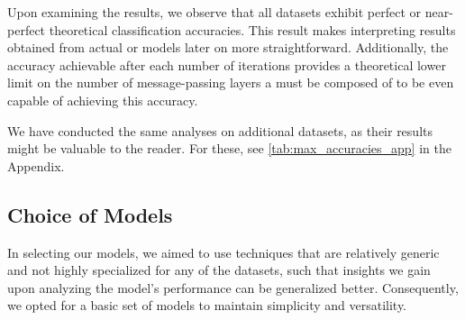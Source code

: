 \begin{table}[!htb]
	\caption{An overview of the maximum theoretical classification accuracy achievable for each dataset based on the number of \wl iterations in percent. A hyphen ``-'' indicates that the maximum accuracy has converged with fewer iterations, implying that further iterations do not improve the accuracy.}
	\label{tab:max_accuracies}
\end{table}

Upon examining the results, we observe that all datasets exhibit perfect or near-perfect theoretical classification accuracies. This result makes interpreting results obtained from actual \wlnn or \gnn models later on more straightforward. Additionally, the accuracy achievable after each number of iterations provides a theoretical lower limit on the number of message-passing layers a \gnn must be composed of to be even capable of achieving this accuracy. 

We have conducted the same analyses on additional datasets, as their results might be valuable to the reader. For these, see \cref{tab:max_accuracies_app} in the Appendix.

\subsection{Choice of Models}
In selecting our models, we aimed to use techniques that are relatively generic and not highly specialized for any of the datasets, such that insights we gain upon analyzing the model's performance can be generalized better. Consequently, we opted for a basic set of models to maintain simplicity and versatility.

